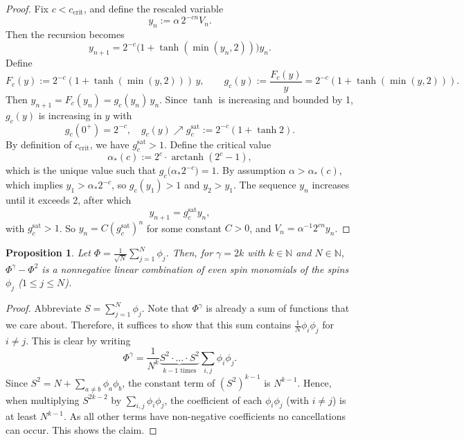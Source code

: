 \documentclass[reqno,11pt]{amsart}
\newcommand{\1}{\mathds{1}}
\theoremstyle{plain}
\newtheorem{proposition}[theorem]{Proposition}
\theoremstyle{definition}
\numberwithin{equation}{section}
\newcommand{\bbN}{{\mathbb N}}
\begin{document}
\begin{proof}
Fix \( c < c_{\mathrm{crit}} \), and define the rescaled variable
\[
y_n := \alpha\,2^{-cn} V_n.
\]
Then the recursion becomes
\[
y_{n+1} = 2^{-c} \big(1 + \tanh(\min(y_n,2))\big) y_n.
\]
Define
\[
F_c(y) := 2^{-c}(1 + \tanh(\min(y,2)))\,y,
\qquad
g_c(y) := \frac{F_c(y)}{y} = 2^{-c}(1 + \tanh(\min(y,2))).
\]
Then \( y_{n+1} = F_c(y_n) = g_c(y_n)\,y_n \). Since \( \tanh \) is increasing and bounded by 1, \( g_c(y) \) is increasing in \( y \) with
\[
g_c(0^+) = 2^{-c}, \quad g_c(y) \nearrow g_c^{\mathrm{sat}} := 2^{-c}(1 + \tanh 2).
\]
By definition of \( c_{\mathrm{crit}} \), we have \( g_c^{\mathrm{sat}} > 1 \).
Define the critical value
\[
\alpha_*(c) := 2^c \cdot \operatorname{arctanh}(2^c - 1),
\]
which is the unique value such that
\(g_c\big(\alpha_* 2^{-c}\big) = 1.\)
By assumption $\alpha > \alpha_*(c)$, which implies
\( y_1 > \alpha_* 2^{-c} \), so \( g_c(y_1) > 1 \) and \( y_2 > y_1 \). The sequence \( y_n \) increases until it exceeds 2, after which
\[
y_{n+1} = g_c^{\mathrm{sat}} y_n,
\]
with \( g_c^{\mathrm{sat}} > 1 \). So \( y_n = C (g_c ^\mathrm{sat})^n \) for some constant $C>0$, and \( V_n = \alpha^{-1} 2^{cn} y_n \).
\end{proof}


\begin{proposition}
    \label{prop:gamma-square-polynomial-positivity}
    Let $\Phi = \frac{1}{\sqrt{N}} \sum\limits_{j=1} ^N \phi_j$. Then, for $\gamma = 2k$ with $k \in \bbN$ and $N \in \bbN$,
    $\Phi^\gamma - \Phi^2$ is a nonnegative linear combination of even spin monomials of the spins $\phi_j$ ($1 \le j \le N$).
\end{proposition}
\begin{proof}
    Abbreviate $S=\sum_{j=1} ^N \phi_j$.
    Note that $\Phi^\gamma$ is already a sum of functions that we care about. Therefore, it suffices to show that this sum contains $\frac{1}{N} \phi_i\phi_j$ for $i \neq j$.
    This is clear by writing 
    \[
    \Phi^\gamma = \frac{1}{N^{k}} \underbrace{S^2\cdot ... \cdot S^2 } _{k-1 \text{ times}}\sum\limits_{i, j} \phi_i \phi_j.
    \]
    Since $S^2 = N + \sum_{a \neq b}\phi_a\phi_b$, the constant term of $(S^2)^{k-1}$
    is $N^{k-1}$. Hence, when multiplying $S^{2k-2}$ by
    $\sum_{i, j}\phi_i\phi_j$, the coefficient of each $\phi_i\phi_j$ (with $i \neq j$)
    is at least $N^{k-1}$. As all other terms have non-negative coefficients no cancellations can occur. This shows the claim.
\end{proof}
\end{document}
